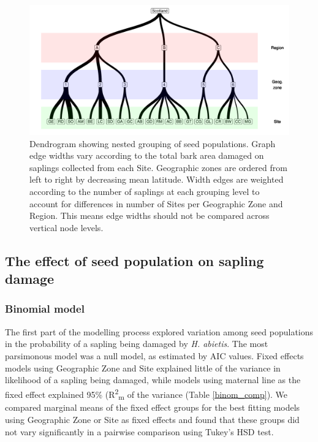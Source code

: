 \documentclass[a4paper, 11pt]{article}
\newcommand{\textapprox}{\raisebox{0.5ex}{\texttildelow}}
\begin{document}
\begin{figure}[H]
	\includegraphics[width=\textwidth]{dendro}
	\caption{Dendrogram showing nested grouping of seed populations. Graph edge widths vary according to the total bark area damaged on saplings collected from each Site. Geographic zones are ordered from left to right by decreasing mean latitude. Width edges are weighted according to the number of saplings at each grouping level to account for differences in number of Sites per Geographic Zone and Region. This means edge widths should not be compared across vertical node levels.}
	\label{dendro}
\end{figure}

\subsection*{The effect of seed population on sapling damage}

\subsubsection*{Binomial model}

The first part of the modelling process explored variation among seed populations in the probability of a sapling being damaged by \textit{H. abietis}. The most parsimonous model was a null model, as estimated by AIC values. Fixed effects models using Geographic Zone and Site explained little of the variance in likelihood of a sapling being damaged, while models using maternal line as the fixed effect explained \textapprox{}95\% (R\textsuperscript{2}\textsubscript{m} of the variance (Table \ref{binom_comp}). We compared marginal means of the fixed effect groups for the best fitting models using Geographic Zone or Site as fixed effects and found that these groups did not vary significantly in a pairwise comparison using Tukey's HSD test.
\end{document}
